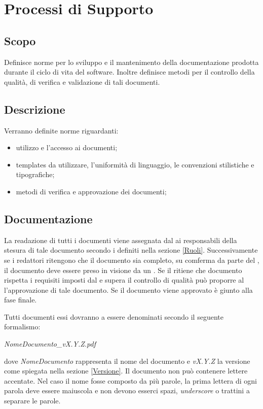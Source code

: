 \documentclass[12pt,a4paper]{article}
\begin{document}
\newpage

\section{Processi di Supporto} %

\subsection{Scopo}
Definisce norme per lo sviluppo e il mantenimento della documentazione prodotta durante il ciclo di vita del software. Inoltre definisce metodi per il controllo della qualità, di verifica e validazione di tali documenti.

\subsection{Descrizione}
Verranno definite norme riguardanti:
\begin{itemize}
  \item utilizzo e l'accesso ai documenti;
  \item templates da utilizzare, l'uniformità di linguaggio, le convenzioni stilistiche e tipografiche;
  \item metodi di verifica e approvazione dei documenti;
\end{itemize}

\subsection{Documentazione}\label{Documentazione} %
La readazione di tutti i documenti viene assegnata dal \PM{} ai responsabili della stesura di tale documento secondo i  definiti nella sezione \ref{Ruoli}. Successivamente se i redattori ritengono che il documento sia completo, su comferma da parte del \PM, il documento deve essere preso in visione da un \VR. Se il \VR ritiene che documento rispetta i requisiti imposti dal \PR{} e supera il controllo di qualità può proporre al \PM{} l'approvazione di tale documento. Se il documento viene approvato è giunto alla fase finale.

Tutti documenti essi dovranno a essere denominati secondo il seguente formalismo:
\begin{center}
\emph{NomeDocumento\_vX.Y.Z.pdf}
\end{center}
dove \emph{NomeDocumento} rappresenta il nome del documento e \emph{vX.Y.Z} la versione come spiegata nella sezione \ref{Versione}. Il documento non può contenere lettere accentate. Nel caso il nome fosse composto da più parole, la prima lettera di ogni parola deve essere maiuscola e non devono esserci spazi, \emph{underscore} o trattini a separare le parole.
\end{document}
